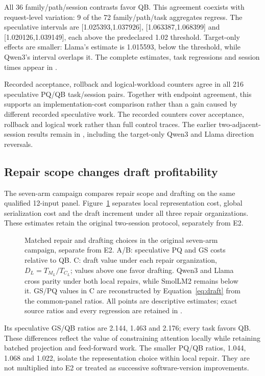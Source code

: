 All 36 family/path/session contrasts favor QB. This agreement coexists with request-level variation: 9 of the 72 family/path/task aggregates regress. The speculative intervals are [1.025393,1.037926], [1.063387,1.068399] and [1.020126,1.039149], each above the predeclared 1.02 threshold. Target-only effects are smaller: Llama's estimate is 1.015593, below the threshold, while Qwen3's interval overlaps it. The complete estimates, task regressions and session times appear in .

Recorded acceptance, rollback and logical-workload counters agree in all 216 speculative PQ/QB task/session pairs. Together with endpoint agreement, this supports an implementation-cost comparison rather than a gain caused by different recorded speculative work. The recorded counters cover acceptance, rollback and logical work rather than full control traces. The earlier two-adjacent-session results remain in , including the target-only Qwen3 and Llama direction reversals.

\subsection{Repair scope changes draft profitability}
\label{sec:economics}
The seven-arm campaign compares repair scope and drafting on the same qualified 12-input panel. Figure~\ref{fig:cost} separates local representation cost, global serialization cost and the draft increment under all three repair organizations. These estimates retain the original two-session protocol, separately from E2.

\begin{figure}[t]\centering
\resizebox{\textwidth}{!}{}
\caption{Matched repair and drafting choices in the original seven-arm campaign, separate from E2. A/B: speculative PQ and GS costs relative to QB. C: draft value under each repair organization, $D_L=T_{M_L}/T_{C_L}$; values above one favor drafting. Qwen3 and Llama cross parity under both local repairs, while SmolLM2 remains below it. GS/PQ values in C are reconstructed by Equation~\ref{eq:draft} from the common-panel ratios. All points are descriptive estimates; exact source ratios and every regression are retained in .}
\label{fig:cost}
\end{figure}

Its speculative GS/QB ratios are 2.144, 1.463 and 2.176; every task favors QB. These differences reflect the value of constraining attention locally while retaining batched projection and feed-forward work. The smaller PQ/QB ratios, 1.044, 1.068 and 1.022, isolate the representation choice within local repair. They are not multiplied into E2 or treated as successive software-version improvements.

